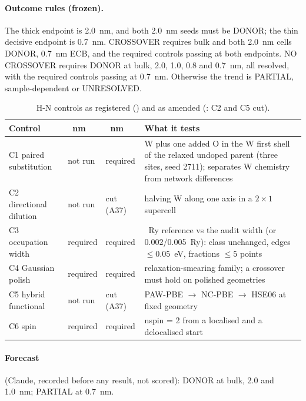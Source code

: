 \paragraph{Outcome rules (frozen).} The thick endpoint is 2.0~nm, and both 2.0~nm seeds must be DONOR; the thin
decisive endpoint is 0.7~nm. CROSSOVER requires bulk and both 2.0~nm cells DONOR, 0.7~nm ECB, and the required controls
passing at both endpoints. NO CROSSOVER requires DONOR at bulk, 2.0, 1.0, 0.8 and 0.7~nm, all resolved, with the
required controls passing at 0.7~nm. Otherwise the trend is PARTIAL, sample-dependent or UNRESOLVED.

\begin{table}[htbp]\centering\small
\caption{H-N controls as registered () and as amended (: C2 and C5 cut).}
\label{tab:mono-am-hn-controls}
\begin{tabularx}{\linewidth}{@{}>{\raggedright\arraybackslash}p{3.6cm}>{\raggedright\arraybackslash}p{2.4cm}>{\raggedright\arraybackslash}p{2.4cm}>{\raggedright\arraybackslash}X@{}}
\toprule
Control & 2.0~nm & 0.7~nm & What it tests \\\midrule
C1 paired substitution & not run & required & W plus one added O in the W first shell of the relaxed undoped parent
(three sites, seed 2711); separates W chemistry from network differences \\
C2 directional dilution & not run & cut (A37) & halving W along one axis in a $2\times1$ supercell \\
C3 occupation width & required & required & 0.001~Ry reference vs the audit width (or 0.002/0.005~Ry): class unchanged,
edges $\le0.05$~eV, fractions $\le5$ points \\
C4 Gaussian polish & required & required & relaxation-smearing family; a crossover must hold on polished geometries \\
C5 hybrid functional & not run & cut (A37) & PAW-PBE $\rightarrow$ NC-PBE $\rightarrow$ HSE06 at fixed geometry \\
C6 spin & required & required & nspin = 2 from a localised and a delocalised start \\\bottomrule
\end{tabularx}
\end{table}

\paragraph{Forecast} (Claude, recorded before any result, not scored): DONOR at bulk, 2.0 and 1.0~nm; PARTIAL at
0.7~nm.

